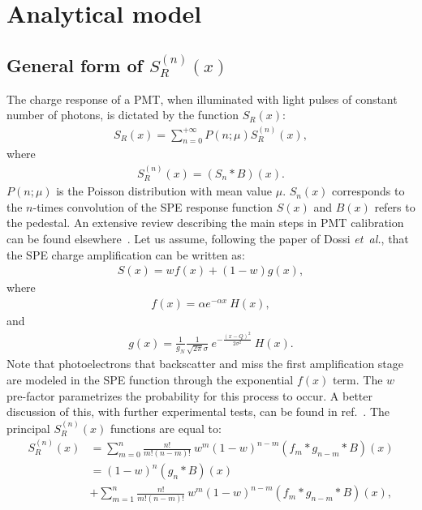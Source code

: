 \documentclass[preprint,12pt]{elsarticle}
\begin{document}
\section{Analytical model}
\label{sec:mod}
%

\subsection{General form of $S^{(n)}_R(x)$ }
%

The charge response of a PMT, when illuminated with light pulses of constant number of photons, is dictated by the function $S_R(x)$:
\begin{align}
S_R(x) = \sum_{n=0}^{+\infty} P(n;\mu) S^{(n)}_R(x), \label{eq:SR}
\end{align}
where 
\begin{align}
S^{(n)}_R(x) = (S_n*B)(x). 
\end{align}
$ P(n;\mu)$ is the Poisson distribution with mean value $\mu$. 
$S_n(x)$ corresponds to the $n$-times convolution of the SPE response function $S(x)$ and $B(x)$ refers to the pedestal. 
An extensive review describing the main steps in PMT calibration can be found elsewhere~\cite{me}. 
Let us assume, following the paper of Dossi \emph{et~al.}, that the SPE charge amplification can be written as:
\begin{align}
S(x) = w f(x) + (1-w)g(x), \label{eq:S}
\end{align}
where 
\begin{align}
f(x) = \alpha e^{-\alpha x } \ H(x),
\end{align}
and
\begin{align}
g(x) = \frac{1}{g_N} \frac{1}{\sqrt{2\pi}\sigma} \ e^{ - \frac{( x - Q )^2}{2\sigma^2}} \ H(x). 
\end{align}
Note that photoelectrons that backscatter and miss the first amplification stage are modeled in the SPE function through the exponential $f(x)$ term. 
The $w$ pre-factor parametrizes the probability for this process to occur. A better discussion of this, with further experimental tests, can be found in ref.~\cite{dossi}. 
The principal $S^{(n)}_R(x)$ functions are equal to: %
\begin{align}
S^{(n)}_R(x) & = \sum_{m=0}^{n}  \frac{n!}{m!(n-m)!} \ w^m (1-w)^{n-m} (f_m*g_{n-m} *B )(x)\nonumber \\
                     & = (1-w)^n (g_{n} *B )(x) \nonumber \\
                    & + \sum_{m=1}^{n}  \frac{n!}{m!(n-m)!} \ w^m (1-w)^{n-m} (f_m*g_{n-m} *B )(x), \label{eq:snr1}
\end{align}
\end{document}

